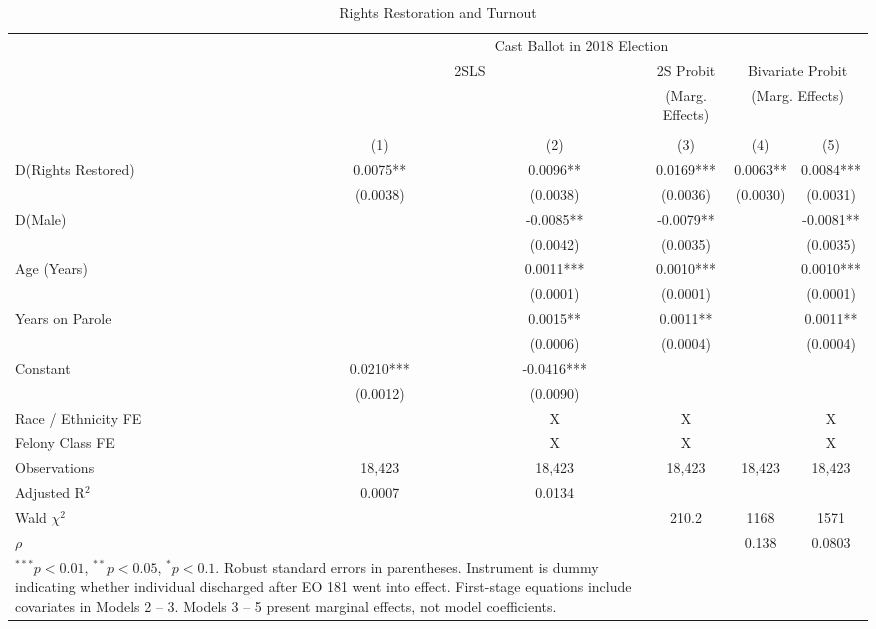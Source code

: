 \documentclass[
  12pt,
]{article}
\begin{document}
\begin{singlespace}
\begin{table}[H]
\caption{\label{tab:iv-models-chunk}\label{tab:iv-models} Rights Restoration and Turnout}
\fontsize{10}{12}\selectfont
\centering

\begin{tabular}{lccccc}
\\[-1.8ex]\hline
& \multicolumn{5}{c}{Cast Ballot in 2018 Election} \\
& \multicolumn{2}{c}{2SLS} & \multicolumn{1}{c}{2S Probit} &   \multicolumn{2}{c}{Bivariate Probit}\\
& & & \multicolumn{1}{c}{(Marg. Effects)} &   \multicolumn{2}{c}{(Marg. Effects)}\\
\cmidrule(l{3pt}r{3pt}){2-3} \cmidrule(l{3pt}r{3pt}){4-4} \cmidrule(l{3pt}r{3pt}){5-6}
\\[-1.8ex] & (1) & (2) & (3) & (4) & (5)\\
\hline
D(Rights Restored) & 0.0075** & 0.0096** & 0.0169*** & 0.0063** & 0.0084*** \\
 & (0.0038) & (0.0038) & (0.0036) & (0.0030) & (0.0031) \\
D(Male) &  & -0.0085** & -0.0079** &  & -0.0081** \\
 &  & (0.0042) & (0.0035) &  & (0.0035) \\
Age (Years) &  & 0.0011*** & 0.0010*** &  & 0.0010*** \\
 &  & (0.0001) & (0.0001) &  & (0.0001) \\
Years on Parole &  & 0.0015** & 0.0011** &  & 0.0011** \\
 &  & (0.0006) & (0.0004) &  & (0.0004) \\
Constant & 0.0210*** & -0.0416*** &  &  &  \\
 & (0.0012) & (0.0090) &  &  &  \\
\hline
Race / Ethnicity FE &  & X & X &  & X \\
Felony Class FE &  & X & X &  & X \\
\hline
Observations & 18,423 & 18,423 & 18,423 & 18,423 & 18,423 \\
Adjusted R$^2$ & 0.0007 & 0.0134 &  &  &  \\
Wald $\chi^2$ &  &  & 210.2 & 1168 & 1571 \\
 $\rho$ &  &  &  & 0.138 & 0.0803 \\
\hline
\multicolumn{3}{l}{\scriptsize{\parbox{.5\linewidth}{\vspace{2pt}$^{***}p<0.01$, $^{**}p<0.05$, $^*p<0.1$. \\
Robust standard errors in parentheses. \\
Instrument is dummy indicating whether \\
individual discharged after EO 181 went into effect. \\
First-stage equations include covariates in Models 2 -- 3. \\
Models 3 -- 5 present marginal effects, not model coefficients.}}}
\end{tabular}
\end{table}

\end{singlespace}
\end{document}
